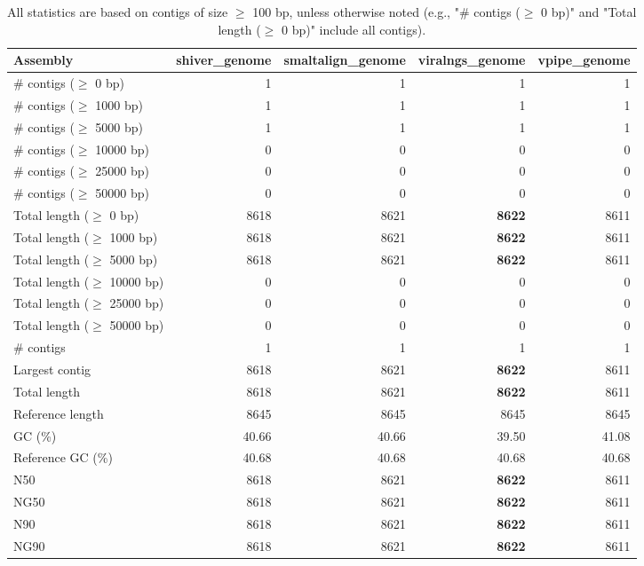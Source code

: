 \documentclass[12pt,a4paper]{article}
\begin{document}
\begin{table}[ht]
\begin{center}
\caption{All statistics are based on contigs of size $\geq$ 100 bp, unless otherwise noted (e.g., "\# contigs ($\geq$ 0 bp)" and "Total length ($\geq$ 0 bp)" include all contigs).}
\begin{tabular}{|l*{4}{|r}|}
\hline
Assembly & shiver\_genome & smaltalign\_genome & viralngs\_genome & vpipe\_genome \\ \hline
\# contigs ($\geq$ 0 bp) & 1 & 1 & 1 & 1 \\ \hline
\# contigs ($\geq$ 1000 bp) & 1 & 1 & 1 & 1 \\ \hline
\# contigs ($\geq$ 5000 bp) & 1 & 1 & 1 & 1 \\ \hline
\# contigs ($\geq$ 10000 bp) & 0 & 0 & 0 & 0 \\ \hline
\# contigs ($\geq$ 25000 bp) & 0 & 0 & 0 & 0 \\ \hline
\# contigs ($\geq$ 50000 bp) & 0 & 0 & 0 & 0 \\ \hline
Total length ($\geq$ 0 bp) & 8618 & 8621 & {\bf 8622} & 8611 \\ \hline
Total length ($\geq$ 1000 bp) & 8618 & 8621 & {\bf 8622} & 8611 \\ \hline
Total length ($\geq$ 5000 bp) & 8618 & 8621 & {\bf 8622} & 8611 \\ \hline
Total length ($\geq$ 10000 bp) & 0 & 0 & 0 & 0 \\ \hline
Total length ($\geq$ 25000 bp) & 0 & 0 & 0 & 0 \\ \hline
Total length ($\geq$ 50000 bp) & 0 & 0 & 0 & 0 \\ \hline
\# contigs & 1 & 1 & 1 & 1 \\ \hline
Largest contig & 8618 & 8621 & {\bf 8622} & 8611 \\ \hline
Total length & 8618 & 8621 & {\bf 8622} & 8611 \\ \hline
Reference length & 8645 & 8645 & 8645 & 8645 \\ \hline
GC (\%) & 40.66 & 40.66 & 39.50 & 41.08 \\ \hline
Reference GC (\%) & 40.68 & 40.68 & 40.68 & 40.68 \\ \hline
N50 & 8618 & 8621 & {\bf 8622} & 8611 \\ \hline
NG50 & 8618 & 8621 & {\bf 8622} & 8611 \\ \hline
N90 & 8618 & 8621 & {\bf 8622} & 8611 \\ \hline
NG90 & 8618 & 8621 & {\bf 8622} & 8611 \\ \hline

\end{tabular}
\end{center}
\end{table}
\end{document}
